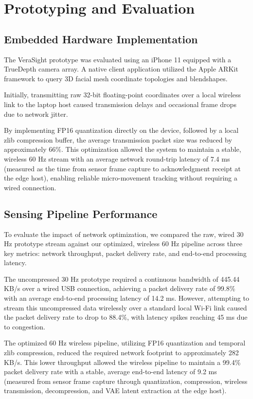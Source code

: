 \documentclass[sigconf]{acmart}
\begin{document}
\section{Prototyping and Evaluation}

\subsection{Embedded Hardware Implementation}
The VeraSight prototype was evaluated using an iPhone 11 equipped with a TrueDepth camera array. A native client application utilized the Apple ARKit framework to query 3D facial mesh coordinate topologies and blendshapes. 

Initially, transmitting raw 32-bit floating-point coordinates over a local wireless link to the laptop host caused transmission delays and occasional frame drops due to network jitter. 

By implementing FP16 quantization directly on the device, followed by a local zlib compression buffer, the average transmission packet size was reduced by approximately 66\%. This optimization allowed the system to maintain a stable, wireless 60 Hz stream with an average network round-trip latency of 7.4 ms (measured as the time from sensor frame capture to acknowledgment receipt at the edge host), enabling reliable micro-movement tracking without requiring a wired connection.

\subsection{Sensing Pipeline Performance}
To evaluate the impact of network optimization, we compared the raw, wired 30 Hz prototype stream against our optimized, wireless 60 Hz pipeline across three key metrics: network throughput, packet delivery rate, and end-to-end processing latency.

The uncompressed 30 Hz prototype required a continuous bandwidth of 445.44 KB/s over a wired USB connection, achieving a packet delivery rate of 99.8\% with an average end-to-end processing latency of 14.2 ms. However, attempting to stream this uncompressed data wirelessly over a standard local Wi-Fi link caused the packet delivery rate to drop to 88.4\%, with latency spikes reaching 45 ms due to congestion.

The optimized 60 Hz wireless pipeline, utilizing FP16 quantization and temporal zlib compression, reduced the required network footprint to approximately 282 KB/s. This lower throughput allowed the wireless pipeline to maintain a 99.4\% packet delivery rate with a stable, average end-to-end latency of 9.2 ms (measured from sensor frame capture through quantization, compression, wireless transmission, decompression, and VAE latent extraction at the edge host).
\end{document}
